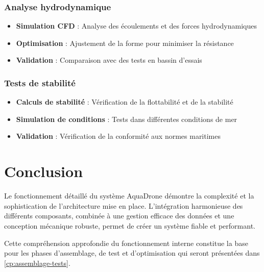 {\subsubsection{Analyse hydrodynamique}
\begin{itemize}
    \item \textbf{Simulation CFD} : Analyse des écoulements et des forces hydrodynamiques
    \item \textbf{Optimisation} : Ajustement de la forme pour minimiser la résistance
    \item \textbf{Validation} : Comparaison avec des tests en bassin d'essais
\end{itemize}

\subsubsection{Tests de stabilité}
\begin{itemize}
    \item \textbf{Calculs de stabilité} : Vérification de la flottabilité et de la stabilité
    \item \textbf{Simulation de conditions} : Tests dans différentes conditions de mer
    \item \textbf{Validation} : Vérification de la conformité aux normes maritimes
\end{itemize}

\section{Conclusion}
Le fonctionnement détaillé du système AquaDrone démontre la complexité et la sophistication de l'architecture mise en place. L'intégration harmonieuse des différents composants, combinée à une gestion efficace des données et une conception mécanique robuste, permet de créer un système fiable et performant.

Cette compréhension approfondie du fonctionnement interne constitue la base pour les phases d'assemblage, de test et d'optimisation qui seront présentées dans \autoref{cp:assemblage-tests}.

} 